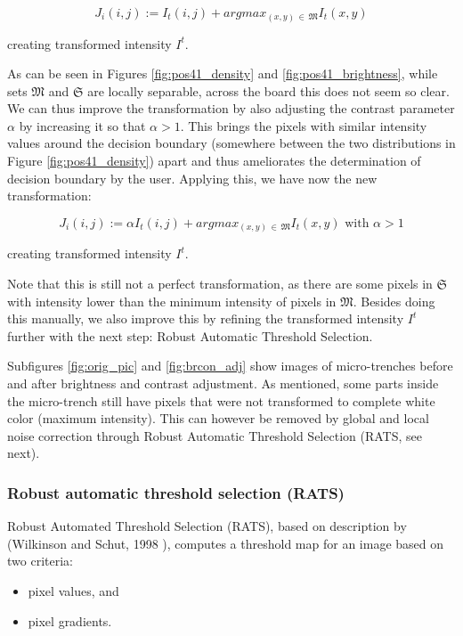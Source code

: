 \documentclass[pdftex,12pt,a4paper]{report}
\begin{document}
$$
J_i(i, j) := I_t(i, j) + argmax_{(x, y) \, \in \, \mathfrak{M}}{I_t(x, y)}
$$

creating transformed intensity $I^t$.

As can be seen in Figures \ref{fig:pos41_density} and \ref {fig:pos41_brightness}, while sets $\mathfrak{M}$ and $\mathfrak{S}$ are locally separable, across the board this does not seem so clear. We can thus improve the transformation by also adjusting the contrast parameter $\alpha$ by increasing it so that $\alpha > 1$. This brings the pixels with similar intensity values around the decision boundary (somewhere between the two distributions in Figure \ref{fig:pos41_density}) apart and thus ameliorates the determination of decision boundary by the user. Applying this, we have now the new transformation:

$$
J_i(i, j) := \alpha I_t(i, j) + argmax_{(x, y) \, \in \, \mathfrak{M}}{I_t(x, y)} \text{ with } \alpha > 1
$$

creating transformed intensity $I^t$.

Note that this is still not a perfect transformation, as there are some pixels in $\mathfrak{S}$ with intensity lower than the minimum intensity of pixels in $\mathfrak{M}$. Besides doing this manually, we also improve this by refining the transformed intensity $I^t$ further with the next step: Robust Automatic Threshold Selection.

Subfigures \ref{fig:orig_pic} and \ref{fig:brcon_adj} show images of micro-trenches before and after brightness and contrast adjustment. As mentioned, some parts inside the micro-trench still have pixels  that were not transformed to complete white color (maximum intensity). This can however be removed by global and local noise correction through Robust Automatic Threshold Selection (RATS, see next).

\subsubsection*{Robust automatic threshold selection (RATS)}
\label{subsubsection:rats}

Robust Automated Threshold Selection (RATS), based on description by (Wilkinson and Schut, 1998 \cite{wilkinson1998digital}), computes a threshold map for an image based on two criteria:

\begin{itemize}
\item pixel values, and
\item pixel gradients. \cite{fiji2017rats}
\end{itemize}
\end{document}
